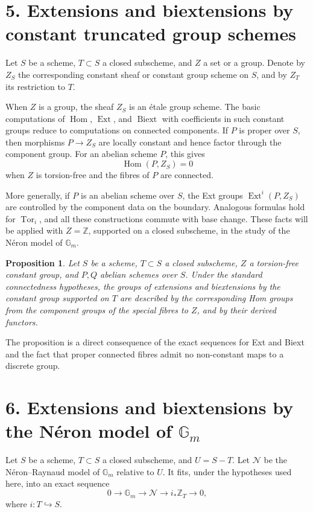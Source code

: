 \documentclass[11pt]{article}
\newtheorem{proposition}{Proposition}[section]
\newcommand{\bZ}{\mathbb Z}
\newcommand{\Gm}{\mathbb G_m}
\newcommand{\Ext}{\operatorname{Ext}}
\newcommand{\Tor}{\operatorname{Tor}}
\newcommand{\Hom}{\operatorname{Hom}}
\newcommand{\Biext}{\operatorname{Biext}}
\begin{document}
\section*{5. Extensions and biextensions by constant truncated group schemes}

Let \(S\) be a scheme, \(T\subset S\) a closed subscheme, and \(Z\) a set or a
group. Denote by \(Z_S\) the corresponding constant sheaf or constant group
scheme on \(S\), and by \(Z_T\) its restriction to \(T\).

When \(Z\) is a group, the sheaf \(Z_S\) is an étale group scheme. The basic
computations of \(\Hom\), \(\Ext\), and \(\Biext\) with coefficients in such
constant groups reduce to computations on connected components. If \(P\) is
proper over \(S\), then morphisms \(P\to Z_S\) are locally constant and hence
factor through the component group. For an abelian scheme \(P\), this gives
\[
\Hom(P,Z_S)=0
\]
when \(Z\) is torsion-free and the fibres of \(P\) are connected.

More generally, if \(P\) is an abelian scheme over \(S\), the Ext groups
\(\Ext^i(P,Z_S)\) are controlled by the component data on the boundary. Analogous
formulas hold for \(\Tor_i\), and all these constructions commute with base
change. These facts will be applied with \(Z=\bZ\), supported on a closed
subscheme, in the study of the Néron model of \(\Gm\).

\begin{proposition}
Let \(S\) be a scheme, \(T\subset S\) a closed subscheme, \(Z\) a torsion-free
constant group, and \(P,Q\) abelian schemes over \(S\). Under the standard
connectedness hypotheses, the groups of extensions and biextensions by the
constant group supported on \(T\) are described by the corresponding Hom groups
from the component groups of the special fibres to \(Z\), and by their derived
functors.
\end{proposition}

The proposition is a direct consequence of the exact sequences for Ext and Biext
and the fact that proper connected fibres admit no non-constant maps to a
discrete group.

\section*{6. Extensions and biextensions by the Néron model of \(\Gm\)}

Let \(S\) be a scheme, \(T\subset S\) a closed subscheme, and \(U=S-T\). Let
\(\mathcal N\) be the Néron--Raynaud model of \(\Gm\) relative to \(U\). It fits,
under the hypotheses used here, into an exact sequence
\[
0\longrightarrow \Gm\longrightarrow \mathcal N\longrightarrow
i_*\bZ_T\longrightarrow 0,
\]
where \(i:T\hookrightarrow S\).
\end{document}
